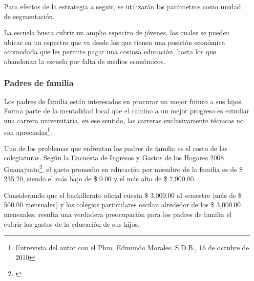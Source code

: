 Para efectos de la estrategia a seguir, se utilizarán los parámetros como unidad de segmentación.

La escuela busca cubrir un amplio espectro de jóvenes, los cuales se pueden ubicar en un espectro que va desde los que tienen una posición económica acomodada que les permite pagar una costosa educación, hasta los que abandonan la escuela por falta de medios económicos.


\subsubsection{Padres de familia}

Los padres de familia están interesados en procurar un mejor futuro a sus hijos. Forma parte de la mentalidad local que el camino a un mejor progreso es estudiar una carrera universitaria, en ese sentido, las carreras exclusivamente técnicas no son apreciadas\footnote{Entrevista del autor con el Pbro. Edmundo Morales, S.D.B., 16 de octubre de 2010}.

Uno de los problemas que enfrentan los padres de familia es el costo de las colegiaturas. Según la Encuesta de Ingresos y Gastos de los Hogares 2008 Guanajuato\footnote{\citep{INEGI-2009-DGES-003}}, el gasto promedio en educaci\'on por miembro de la familia es de \$ 235.20, siendo el m\'as bajo de \$ 0.00 y el m\'as alto de \$ 7,900.00.

Considerando que el bachillerato oficial cuesta \$ 3,000.00 al semestre (m\'as de \$ 500.00 mensuales) y los colegios particulares oscilan alrededor de los \$ 3,000.00 mensuales; resulta una verdadera preocupaci\'on para los padres de familia el cubrir los gastos de la educaci\'on de sus hijos.

